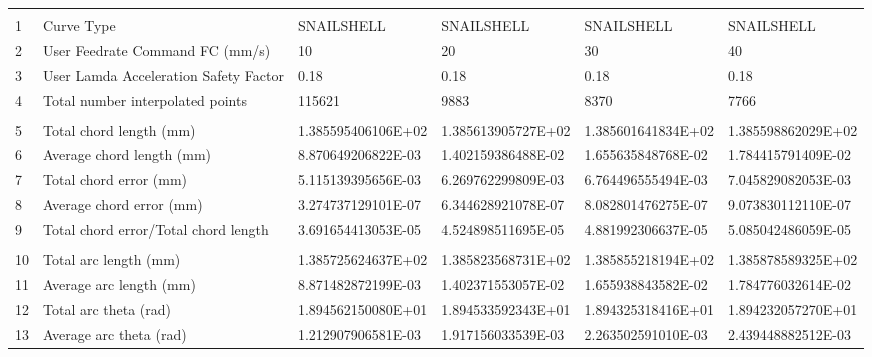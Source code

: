 

\begin{tabular}{ p{0.5cm} p{8.0cm} p{4.00cm} p{4.0cm} p{4.00cm} p{4.0cm}}
\hline
	&                                                      &                    &                      &                    & \\
1	& Curve Type	                                       & SNAILSHELL	        & SNAILSHELL	       & SNAILSHELL	        & SNAILSHELL \\
2	& User Feedrate Command FC (mm/s)                      &	10	            &    20                &	30	            &    40 \\
3	& User Lamda Acceleration Safety Factor	               &   0.18             &	0.18               &   0.18             &   0.18 \\
4	& Total number interpolated points	                   &   115621	        &  9883	               & 8370	            &   7766 \\
	&                                                      &                    &                      &                    & \\
5	& Total chord length (mm)	                           & 1.385595406106E+02	& 1.385613905727E+02   & 1.385601641834E+02	& 1.385598862029E+02 \\
6	& Average chord length (mm)	                           & 8.870649206822E-03	& 1.402159386488E-02   & 1.655635848768E-02	& 1.784415791409E-02 \\
7	& Total chord error (mm)	                           & 5.115139395656E-03	& 6.269762299809E-03   & 6.764496555494E-03	& 7.045829082053E-03 \\
8	& Average chord error (mm)	                           & 3.274737129101E-07	& 6.344628921078E-07   & 8.082801476275E-07	& 9.073830112110E-07 \\
9	& Total chord error/Total chord length                 & 3.691654413053E-05	& 4.524898511695E-05   & 4.881992306637E-05	& 5.085042486059E-05 \\
	&                                                      &                    &                      &                    & \\
10	& Total arc length (mm)	                               & 1.385725624637E+02	& 1.385823568731E+02   & 1.385855218194E+02	& 1.385878589325E+02 \\
11	& Average arc length (mm)	                           & 8.871482872199E-03	& 1.402371553057E-02   & 1.655938843582E-02	& 1.784776032614E-02 \\
12	& Total arc theta (rad)	                               & 1.894562150080E+01	& 1.894533592343E+01   & 1.894325318416E+01	& 1.894232057270E+01 \\
13	& Average arc theta (rad)	                           & 1.212907906581E-03	& 1.917156033539E-03   & 2.263502591010E-03	& 2.439448882512E-03 \\


\end{tabular}
